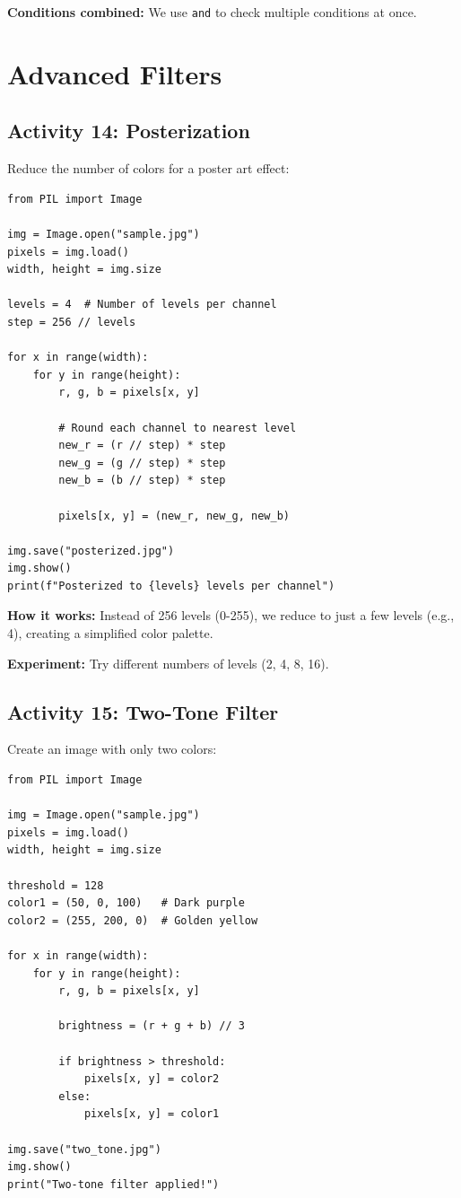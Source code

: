 \documentclass[11pt]{article}
\begin{document}
\textbf{Conditions combined:} We use \texttt{and} to check multiple conditions at once.

\section{Advanced Filters}

\subsection*{Activity 14: Posterization}

Reduce the number of colors for a poster art effect:

\begin{lstlisting}
from PIL import Image

img = Image.open("sample.jpg")
pixels = img.load()
width, height = img.size

levels = 4  # Number of levels per channel
step = 256 // levels

for x in range(width):
    for y in range(height):
        r, g, b = pixels[x, y]

        # Round each channel to nearest level
        new_r = (r // step) * step
        new_g = (g // step) * step
        new_b = (b // step) * step

        pixels[x, y] = (new_r, new_g, new_b)

img.save("posterized.jpg")
img.show()
print(f"Posterized to {levels} levels per channel")
\end{lstlisting}

\textbf{How it works:} Instead of 256 levels (0-255), we reduce to just a few levels (e.g., 4), creating a simplified color palette.

\textbf{Experiment:} Try different numbers of levels (2, 4, 8, 16).

\subsection*{Activity 15: Two-Tone Filter}

Create an image with only two colors:

\begin{lstlisting}
from PIL import Image

img = Image.open("sample.jpg")
pixels = img.load()
width, height = img.size

threshold = 128
color1 = (50, 0, 100)   # Dark purple
color2 = (255, 200, 0)  # Golden yellow

for x in range(width):
    for y in range(height):
        r, g, b = pixels[x, y]

        brightness = (r + g + b) // 3

        if brightness > threshold:
            pixels[x, y] = color2
        else:
            pixels[x, y] = color1

img.save("two_tone.jpg")
img.show()
print("Two-tone filter applied!")
\end{lstlisting}
\end{document}
